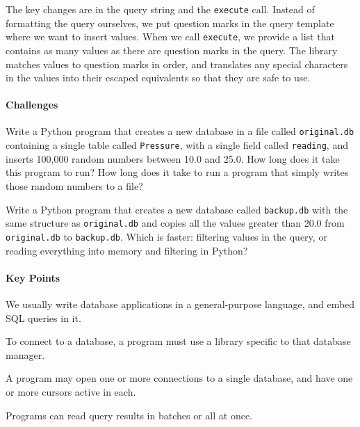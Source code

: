\documentclass{book}
\begin{document}
The key changes are in the query string and the \texttt{execute} call.
Instead of formatting the query ourselves, we put question marks in the
query template where we want to insert values. When we call
\texttt{execute}, we provide a list that contains as many values as
there are question marks in the query. The library matches values to
question marks in order, and translates any special characters in the
values into their escaped equivalents so that they are safe to use.

\mbox{}\paragraph{Challenges}

\begin{swcenumerate}
\item
  Write a Python program that creates a new database in a file called
  \texttt{original.db} containing a single table called
  \texttt{Pressure}, with a single field called \texttt{reading}, and
  inserts 100,000 random numbers between 10.0 and 25.0. How long does it
  take this program to run? How long does it take to run a program that
  simply writes those random numbers to a file?
\item
  Write a Python program that creates a new database called
  \texttt{backup.db} with the same structure as \texttt{original.db} and
  copies all the values greater than 20.0 from \texttt{original.db} to
  \texttt{backup.db}. Which is faster: filtering values in the query, or
  reading everything into memory and filtering in Python?
\end{swcenumerate}

\mbox{}\paragraph{Key Points}

\begin{swcitemize}
\item
  We usually write database applications in a general-purpose language,
  and embed SQL queries in it.
\item
  To connect to a database, a program must use a library specific to
  that database manager.
\item
  A program may open one or more connections to a single database, and
  have one or more cursors active in each.
\item
  Programs can read query results in batches or all at once.
\end{swcitemize}
\end{document}
